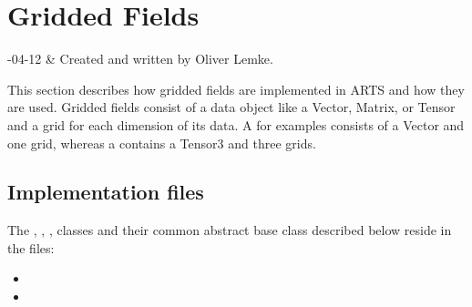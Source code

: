 %
%
\chapter{Gridded Fields}


%
%
-04-12 & Created and written by Oliver Lemke.\\
\stophistory




%
%

This section describes how gridded fields are implemented in
ARTS and how they are used. Gridded fields consist of a data object like a Vector, Matrix, or Tensor and a grid for each dimension of its data. A  for examples consists of a Vector and one grid, whereas a  contains a Tensor3 and three grids.


\section{Implementation files}

The , , ,   classes and their common abstract base class  described below reside in the files:
\begin{itemize}
\item {}
\item {}
\end{itemize}


